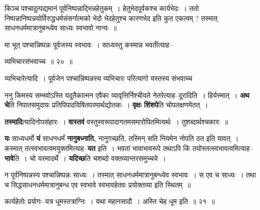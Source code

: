\documentclass[article,12pt,a4paper]{memoir}
\begin{document}
	  \pstart किञ्च पश्चादुत्पद्यमानं पूर्वनिष्पन्नाद्भिन्नहेतुकम् । हेतुभेदपूर्वकश्च कार्यभेदः । ततो निष्पन्नानिष्पन्नयोर्विरुद्धधर्मसंसर्गात्मको भेदो भेदहेतुश्च कारणभेद इति कुत एकत्वम् ? तस्मात् साधनधर्ममात्रानुबन्ध्येव साध्यः स्वभावो नान्यः ॥
	\pend
        

	  \pstart मा भूत् पश्चान्निष्पन्नः पूर्वजस्य स्वभावः । साध्यस्तु कस्मान्न भवतीत्याह--
	\pend
        
	  \bigskip
	  \begingroup
	

	  \pstart व्यभिचारसंभवाच्च ॥ २० ॥
	\pend
      
	  \endgroup
	 

	  \pstart {}व्यभिचारेत्यादि । पूर्वजेन पश्चान्निष्पन्नस्य व्यभिचारः परित्यागो यस्तस्य संभवाच्च
	\pend
      
	  \endgroup
	

	  \pstart ननु किमस्य सम्भवोऽस्ति यदुतैकात्मन एवैका व्यावृत्तिर्निश्चीयते नेतरेत्याह--दूरादिति । हिर्यस्मात् । \textbf{अथ चे}ति निपातसमुदायः प्रतिपिपादयिषितपरमार्थद्योतकः । \textbf{वृक्षः शिंशपे}ति चोपलक्षणमेतत् ।
	\pend
      

	  \pstart \textbf{तस्मादि}त्यादिनोपसंहारः । \textbf{वास्तवं} वस्तुस्वरूपादागतमसमारोपितमित्यर्थः । तुशब्दार्थश्चकारः ॥
	\pend
      

	  \pstart \textbf{यः} साध्यधर्मो \textbf{यं} साधनधर्मं \textbf{नानुबध्नाति,} नानुगच्छति, तस्मिन् सति नियमेन नोपति ठत इति यावत् । कस्मात् तत्स्वभावत्वमयुक्तमित्याह--\textbf{यत} इति । भवतां भावाभावरूपे तथाऽपि किं तयोस्तत्स्वभावत्वमित्याह--\textbf{भावे}ति । चो यस्मादर्थे । \textbf{यदिच्छ}ति चशब्दो वक्तव्यान्तरसमुच्चये ।
	\pend
	  \bigskip
	  \begingroup
	

	  \pstart न पूर्वनिष्पन्नस्य पश्चान्निष्पन्नः साध्यः । तस्मात् साधनधर्ममात्रानुबन्ध्येव स्वभावः । स एव च साध्यः । तथा च सिद्धसाधनधर्ममात्रानुबन्ध एव स्वभावे स्वभावहेतवः प्रयोक्तव्या इति स्थितम् ॥
	\pend
        
	  \bigskip
	  \begingroup
	

	  \pstart कार्यहेतोः प्रयोगः--यत्र धूमस्तत्राग्निः । यथा महानसादौ । अस्ति चेह धूम इति ॥ २१ ॥
	\pend
      
\end{document}
